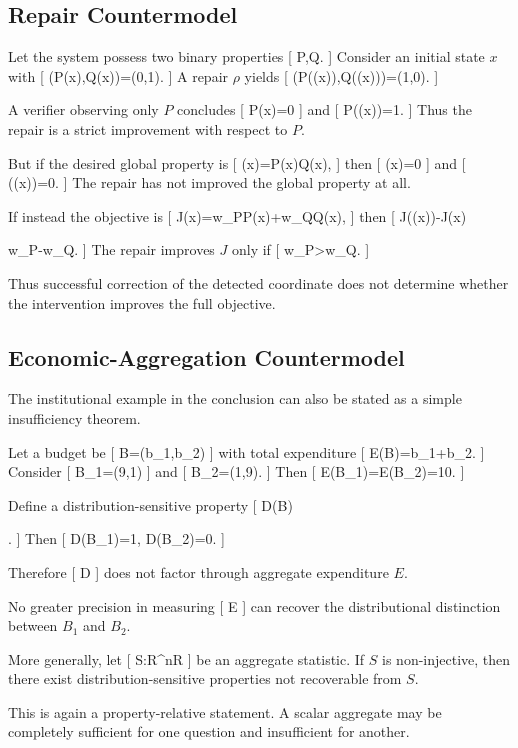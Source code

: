 \documentclass[11pt]{article}
\begin{document}
\subsection{Repair Countermodel}

Let the system possess two binary properties
[
P,Q.
]
Consider an initial state $x$ with
[
(P(x),Q(x))=(0,1).
]
A repair $\rho$ yields
[
(P(\rho(x)),Q(\rho(x)))=(1,0).
]

A verifier observing only $P$ concludes
[
P(x)=0
]
and
[
P(\rho(x))=1.
]
Thus the repair is a strict improvement with respect to $P$.

But if the desired global property is
[
\Phi(x)=P(x)\land Q(x),
]
then
[
\Phi(x)=0
]
and
[
\Phi(\rho(x))=0.
]
The repair has not improved the global property at all.

If instead the objective is
[
J(x)=w_PP(x)+w_QQ(x),
]
then
[
J(\rho(x))-J(x)

w_P-w_Q.
]
The repair improves $J$ only if
[
w_P>w_Q.
]

Thus successful correction of the detected coordinate does not determine whether the intervention improves the full objective.

\subsection{Economic-Aggregation Countermodel}

The institutional example in the conclusion can also be stated as a simple insufficiency theorem.

Let a budget be
[
B=(b_1,b_2)
]
with total expenditure
[
E(B)=b_1+b_2.
]
Consider
[
B_1=(9,1)
]
and
[
B_2=(1,9).
]
Then
[
E(B_1)=E(B_2)=10.
]

Define a distribution-sensitive property
[
D(B)

.
]
Then
[
D(B_1)=1,
\qquad
D(B_2)=0.
]

Therefore
[
D
]
does not factor through aggregate expenditure $E$.

No greater precision in measuring
[
E
]
can recover the distributional distinction between $B_1$ and $B_2$.

More generally, let
[
S:\mathbb R^n\to\mathbb R
]
be an aggregate statistic. If $S$ is non-injective, then there exist distribution-sensitive properties not recoverable from $S$.

This is again a property-relative statement. A scalar aggregate may be completely sufficient for one question and insufficient for another.
\end{document}
